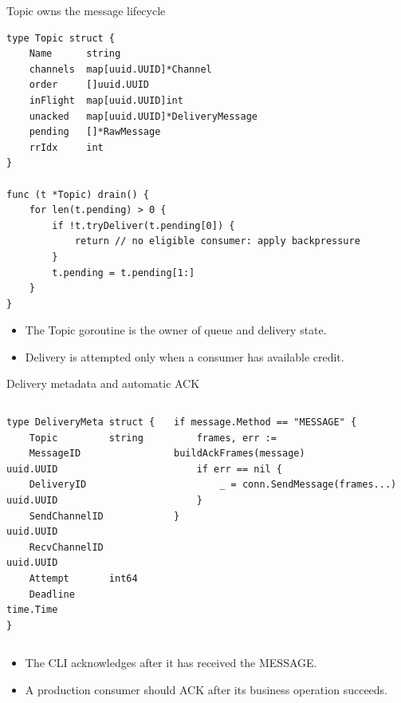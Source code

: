 \documentclass[aspectratio=169,10pt]{beamer}
\begin{document}
\begin{frame}[fragile,shrink=8]{Topic owns the message lifecycle}
  \begin{lstlisting}[style=go]
type Topic struct {
    Name      string
    channels  map[uuid.UUID]*Channel
    order     []uuid.UUID
    inFlight  map[uuid.UUID]int
    unacked   map[uuid.UUID]*DeliveryMessage
    pending   []*RawMessage
    rrIdx     int
}

func (t *Topic) drain() {
    for len(t.pending) > 0 {
        if !t.tryDeliver(t.pending[0]) {
            return // no eligible consumer: apply backpressure
        }
        t.pending = t.pending[1:]
    }
}
  \end{lstlisting}
  \begin{itemize}
    \item The Topic goroutine is the owner of queue and delivery state.
    \item Delivery is attempted only when a consumer has available credit.
  \end{itemize}
\end{frame}

\begin{frame}[fragile]{Delivery metadata and automatic ACK}
  \begin{columns}[T,onlytextwidth]
    \begin{lstlisting}[style=go]
type DeliveryMeta struct {
    Topic         string
    MessageID     uuid.UUID
    DeliveryID    uuid.UUID
    SendChannelID uuid.UUID
    RecvChannelID uuid.UUID
    Attempt       int64
    Deadline      time.Time
}
    \end{lstlisting}
    \begin{lstlisting}[style=go]
if message.Method == "MESSAGE" {
    frames, err := buildAckFrames(message)
    if err == nil {
        _ = conn.SendMessage(frames...)
    }
}
    \end{lstlisting}
  \end{columns}
  \begin{itemize}
    \item The CLI acknowledges after it has received the MESSAGE.
    \item A production consumer should ACK after its business operation succeeds.
  \end{itemize}
\end{frame}
\end{document}
